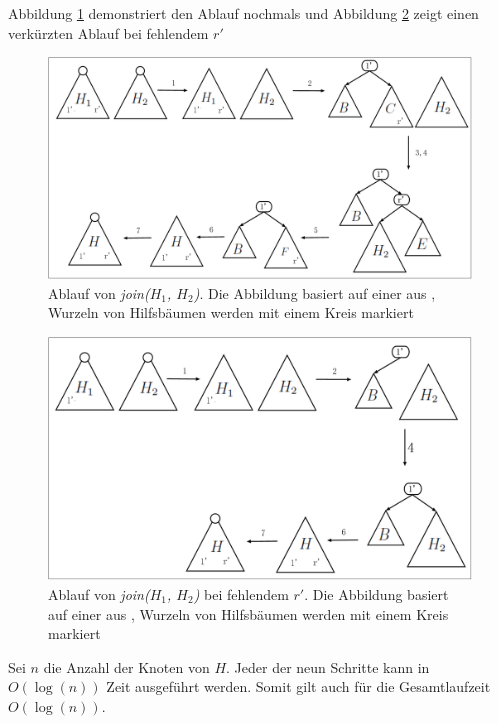 \documentclass[a4paper,12pt]{article}
\begin{document}
Abbildung \ref{fig:join} demonstriert den Ablauf nochmals und Abbildung \ref{fig:join2} zeigt einen verkürzten Ablauf bei fehlendem $r'$
\begin{figure}[h]
	\centering
	\includegraphics[width=1\textwidth]{"Medien/Tango/join"}
	\caption{Ablauf von \textit{join($H_1$, $H_2$)}. Die Abbildung basiert auf einer aus \cite{demainDinamicOpti}, Wurzeln von Hilfsbäumen werden mit einem Kreis markiert }
	\label{fig:join}
\end{figure}
\begin{figure}[h]
	\centering
	\includegraphics[width=1\textwidth]{"Medien/Tango/join2"}
	\caption{Ablauf von  \textit{join($H_1$, $H_2$)} bei fehlendem $r'$. Die Abbildung basiert auf einer aus \cite{demainDinamicOpti}, Wurzeln von Hilfsbäumen werden mit einem Kreis markiert }
	\label{fig:join2}
\end{figure}

Sei $n$ die Anzahl der Knoten von $H$. Jeder der neun Schritte kann in $O\left(\log \left(n\right)\right)$ Zeit ausgeführt werden. Somit gilt auch für die Gesamtlaufzeit $O\left(\log \left(n\right)\right)$.
\end{document}
